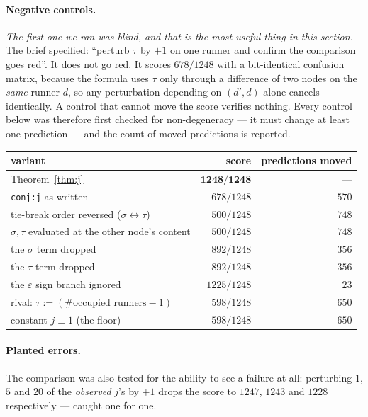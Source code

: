 \documentclass[11pt]{article}
\theoremstyle{definition}
\theoremstyle{remark}
\begin{document}
\paragraph{Negative controls.} \emph{The first one we ran was blind, and that is the most
useful thing in this section.} The brief specified: ``perturb $\tau$ by $+1$ on one
runner and confirm the comparison goes red''. It does not go red. It scores $678/1248$
with a bit-identical confusion matrix, because the formula uses $\tau$ only through a
difference of two nodes on the \emph{same} runner $d$, so any perturbation depending on
$(d',d)$ alone cancels identically. A control that cannot move the score verifies
nothing. Every control below was therefore first checked for non-degeneracy --- it must
change at least one prediction --- and the count of moved predictions is reported.

\begin{center}
\begin{tabular}{lrr}
\hline
variant & score & predictions moved \\
\hline
Theorem~\ref{thm:j} & $\mathbf{1248/1248}$ & --- \\
\texttt{conj:j} as written & $678/1248$ & $570$ \\
tie-break order reversed ($\sigma\leftrightarrow\tau$) & $500/1248$ & $748$ \\
$\sigma,\tau$ evaluated at the other node's content & $500/1248$ & $748$ \\
the $\sigma$ term dropped & $892/1248$ & $356$ \\
the $\tau$ term dropped & $892/1248$ & $356$ \\
the $\varepsilon$ sign branch ignored & $1225/1248$ & $23$ \\
rival: $\tau:=(\#\text{occupied runners}-1)$ & $598/1248$ & $650$ \\
constant $j\equiv1$ (the floor) & $598/1248$ & $650$ \\
\hline
\end{tabular}
\end{center}

\paragraph{Planted errors.} The comparison was also tested for the ability to see a
failure at all: perturbing $1$, $5$ and $20$ of the \emph{observed} $j$'s by $+1$ drops
the score to $1247$, $1243$ and $1228$ respectively --- caught one for one.
\end{document}
